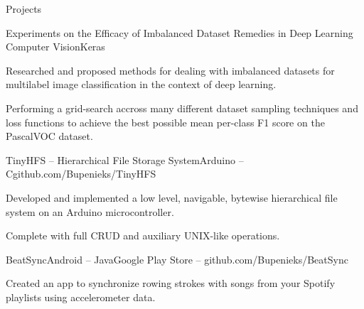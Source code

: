 \documentclass{resume} %
\begin{document}
\begin{rSection}{Projects}



\begin{rSubsection}{Experiments on the Efficacy of Imbalanced Dataset Remedies in Deep Learning Computer Vision}{}{Keras}{}
	\item Researched and proposed methods for dealing with imbalanced datasets for multilabel image classification in the context of deep learning.
	
	\item Performing a grid-search accross many different dataset sampling techniques and loss functions to achieve the best possible mean per-class F1 score on the PascalVOC dataset.
\end{rSubsection}

\begin{rSubsection}{TinyHFS -- Hierarchical File Storage System}{}{Arduino -- C}{github.com/Bupenieks/TinyHFS}

\item Developed and implemented a low level, navigable, bytewise hierarchical file system on an Arduino microcontroller.%
\item Complete with full CRUD and auxiliary UNIX-like operations.
\end{rSubsection}


\begin{rSubsection}{BeatSync}{}{Android -- Java}{Google Play Store -- github.com/Bupenieks/BeatSync}
\item Created an app to synchronize rowing strokes with songs from your Spotify playlists using accelerometer data.
\end{rSubsection}





\end{rSection}
\end{document}
